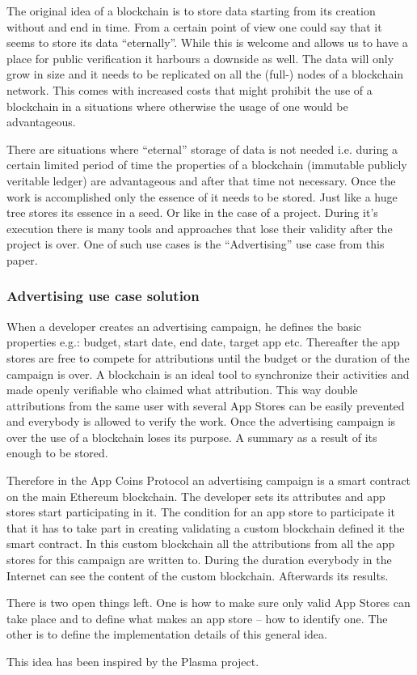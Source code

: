 The original idea of a blockchain is to store data starting from its creation without and end in time. From a certain point of view one could say that it seems to store its data “eternally”. While this is welcome and allows us to have a place for public verification it harbours a downside as well. The data will only grow in size and it needs to be replicated on all the (full-) nodes of a blockchain network. This comes with increased costs that might prohibit the use of a blockchain in a situations where otherwise the usage of one would be advantageous.

There are situations where “eternal” storage of data is not needed i.e. during a certain limited period of time the properties of a blockchain (immutable publicly veritable ledger) are advantageous and after that time not necessary. Once the work is accomplished only the essence of it needs to be stored. Just like a huge tree stores its essence in a seed. Or like in the case of a project. During it’s execution there is many tools and approaches that lose their validity after the project is over. One of such use cases is the “Advertising” use case from this paper. 

\subsubsection{Advertising use case solution}

When a developer creates an advertising campaign, he defines the basic properties e.g.: budget, start date, end date, target app etc. Thereafter the app stores are free to compete for attributions until the budget or the duration of the campaign is over. A blockchain is an ideal tool to synchronize their activities and made openly verifiable who claimed what attribution. This way double attributions from the same user with several App Stores can be easily prevented and everybody is allowed to verify the work. Once the advertising campaign is over the use of a blockchain loses its purpose. A summary as a result of its enough to be stored. 

Therefore in the App Coins Protocol an advertising campaign is a smart contract on the main Ethereum blockchain. The developer sets its attributes and app stores start participating in it. The condition for an app store to participate it that it has to take part in creating validating a custom blockchain defined it the smart contract. In this custom blockchain all the attributions from all the app stores for this campaign are written to. During the duration everybody in the Internet can see the content of the custom blockchain. Afterwards its results. 

There is two open things left. One is how to make sure only valid App Stores can take place and to define what makes an app store – how to identify one. The other is to define the implementation details of this general idea.

This idea has been inspired by the Plasma\cite{plasma} project.
